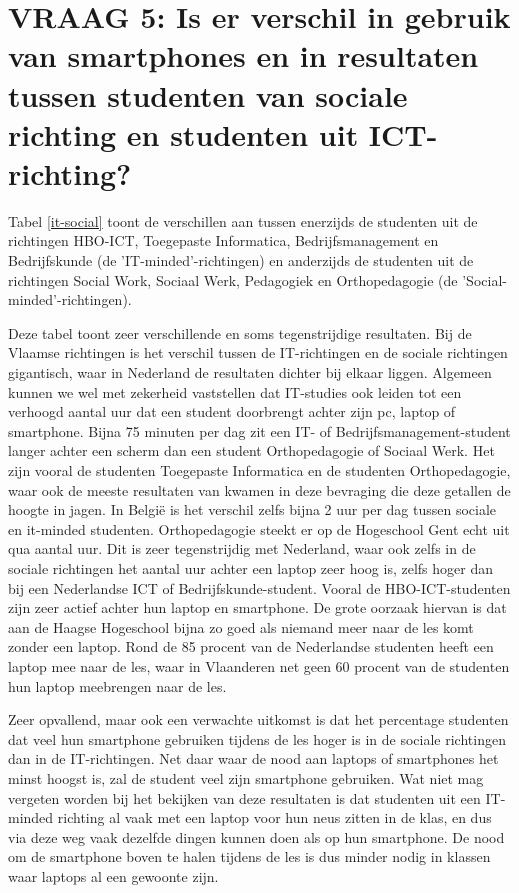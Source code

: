 \section{VRAAG 5: Is er verschil in gebruik van smartphones en in resultaten tussen studenten van sociale richting en studenten uit ICT-richting?}
\label{sec:sociale-it-richting}

Tabel \ref{it-social} toont de verschillen aan tussen enerzijds de studenten uit de richtingen HBO-ICT, Toegepaste Informatica, Bedrijfsmanagement en Bedrijfskunde (de 'IT-minded'-richtingen) en anderzijds de studenten uit de richtingen Social Work, Sociaal Werk, Pedagogiek en Orthopedagogie (de 'Social-minded'-richtingen).

Deze tabel toont zeer verschillende en soms tegenstrijdige resultaten. Bij de Vlaamse richtingen is het verschil tussen de IT-richtingen en de sociale richtingen gigantisch, waar in Nederland de resultaten dichter bij elkaar liggen. Algemeen kunnen we wel met zekerheid vaststellen dat IT-studies ook leiden tot een verhoogd aantal uur dat een student doorbrengt achter zijn pc, laptop of smartphone. Bijna 75 minuten per dag zit een IT- of Bedrijfsmanagement-student langer achter een scherm dan een student Orthopedagogie of Sociaal Werk. Het zijn vooral de studenten Toegepaste Informatica en de studenten Orthopedagogie, waar ook de meeste resultaten van kwamen in deze bevraging die deze getallen de hoogte in jagen. In België is het verschil zelfs bijna 2 uur per dag tussen sociale en it-minded studenten. Orthopedagogie steekt er op de Hogeschool Gent echt uit qua aantal uur. Dit is zeer tegenstrijdig met Nederland, waar ook zelfs in de sociale richtingen het aantal uur achter een laptop zeer hoog is, zelfs hoger dan bij een Nederlandse ICT of Bedrijfskunde-student. Vooral de HBO-ICT-studenten zijn zeer actief achter hun laptop en smartphone. De grote oorzaak hiervan is dat aan de Haagse Hogeschool bijna zo goed als niemand meer naar de les komt zonder een laptop. Rond de 85 procent van de Nederlandse studenten heeft een laptop mee naar de les, waar in Vlaanderen net geen 60 procent van de studenten hun laptop meebrengen naar de les.

Zeer opvallend, maar ook een verwachte uitkomst is dat het percentage studenten dat veel hun smartphone gebruiken tijdens de les hoger is in de sociale richtingen dan in de IT-richtingen. Net daar waar de nood aan laptops of smartphones het minst hoogst is, zal de student veel zijn smartphone gebruiken. Wat niet mag vergeten worden bij het bekijken van deze resultaten is dat studenten uit een IT-minded richting al vaak met een laptop voor hun neus zitten in de klas, en dus via deze weg vaak dezelfde dingen kunnen doen als op hun smartphone. De nood om de smartphone boven te halen tijdens de les is dus minder nodig in klassen waar laptops al een gewoonte zijn.


